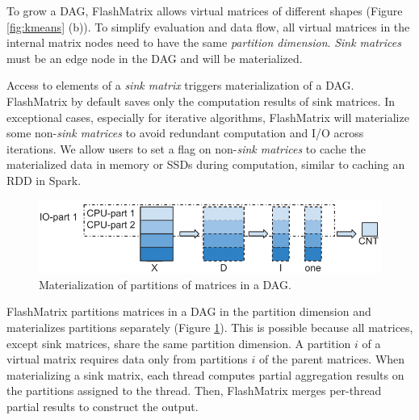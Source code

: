 To grow a DAG, FlashMatrix allows virtual matrices of different shapes
(Figure \ref{fig:kmeans} (b)). To simplify evaluation and data flow, 
all virtual matrices in the internal matrix nodes need to have the same
\textit{partition dimension}. \textit{Sink matrices} must be an edge node
in the DAG and will be materialized.

Access to elements of a \textit{sink matrix} triggers materialization of a DAG.
FlashMatrix by default saves only the computation results of sink matrices.
In exceptional cases, especially for iterative algorithms,
FlashMatrix will materialize some non-\textit{sink matrices} to avoid
redundant computation and I/O across iterations.  We allow users to
set a flag on non-\textit{sink matrices} to cache the materialized data in memory
or SSDs during computation, similar to caching an RDD in Spark.

\begin{figure}
	\centering
	\includegraphics[scale=0.6]{FlashMatrix_figs/materialize.pdf}
	\caption{Materialization of partitions of matrices in a DAG.}
	\label{fig:mater}
\end{figure}

FlashMatrix partitions matrices in a DAG in the partition dimension and
materializes partitions separately (Figure \ref{fig:mater}). This is possible
because all matrices, except sink matrices, share the same partition dimension. 
A partition $i$ of a virtual matrix requires data only from partitions
$i$ of the parent matrices.
When materializing a sink matrix, each thread computes partial
aggregation results on the partitions assigned to the thread. 
Then, FlashMatrix merges per-thread partial results to construct the output.


